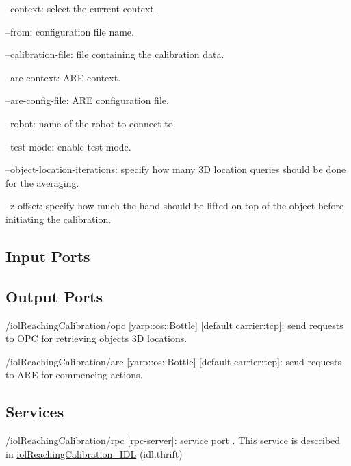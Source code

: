 \begin{DoxyItemize}
\item --context\+: select the current context.
\item --from\+: configuration file name.
\item --calibration-\/file\+: file containing the calibration data.
\item --are-\/context\+: A\+RE context.
\item --are-\/config-\/file\+: A\+RE configuration file.
\item --robot\+: name of the robot to connect to.
\item --test-\/mode\+: enable test mode.
\item --object-\/location-\/iterations\+: specify how many 3D location queries should be done for the averaging.
\item --z-\/offset\+: specify how much the hand should be lifted on top of the object before initiating the calibration. 
\end{DoxyItemize}\hypertarget{group__iolReachingCalibration_inputports_sec}{}\subsection{Input Ports}\label{group__iolReachingCalibration_inputports_sec}
\hypertarget{group__iolReachingCalibration_outputports_sec}{}\subsection{Output Ports}\label{group__iolReachingCalibration_outputports_sec}

\begin{DoxyItemize}
\item /iol\+Reaching\+Calibration/opc \mbox{[}yarp\+::os\+::\+Bottle\mbox{]} \mbox{[}default carrier\+:tcp\mbox{]}\+: send requests to O\+PC for retrieving objects 3D locations.
\item /iol\+Reaching\+Calibration/are \mbox{[}yarp\+::os\+::\+Bottle\mbox{]} \mbox{[}default carrier\+:tcp\mbox{]}\+: send requests to A\+RE for commencing actions.
\end{DoxyItemize}\hypertarget{group__iolReachingCalibration_services_sec}{}\subsection{Services}\label{group__iolReachingCalibration_services_sec}

\begin{DoxyItemize}
\item /iol\+Reaching\+Calibration/rpc \mbox{[}rpc-\/server\mbox{]}\+: service port . This service is described in \mbox{\hyperlink{classiolReachingCalibration__IDL}{iol\+Reaching\+Calibration\+\_\+\+I\+DL}} (idl.\+thrift) 
\end{DoxyItemize}